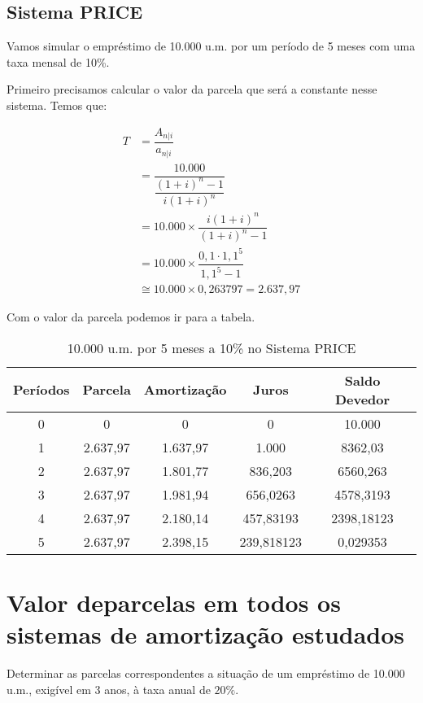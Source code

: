 \subsection{Sistema PRICE}

Vamos simular o empréstimo de 10.000 u.m. por um período de 5 meses com uma taxa mensal de 10\%.

Primeiro precisamos calcular o valor da parcela que será a constante nesse sistema. Temos que:

\begin{align*}
T&=\dfrac{A_{n|i}}{a_{n|i}}\\
&=\dfrac{10.000}{\dfrac{(1+i)^n-1}{i(1+i)^n}}\\
&=10.000\times \dfrac{i(1+i)^n}{(1+i)^n-1}\\
&=10.000 \times \dfrac{0,1\cdot 1,1^5}{1,1^5-1}\\
&\cong 10.000 \times 0,263797= 2.637,97
\end{align*}

Com o valor da parcela podemos ir para a tabela.

\begin{table}[h]
    \centering
    \begin{tabular}{|c|c|c|c|c|}
    \hline
       Períodos  &  Parcela & Amortização & Juros & Saldo Devedor\\
    \hline
       0  & 0 & 0 & 0 & 10.000\\
    \hline
    1     & 2.637,97 & 1.637,97 & 1.000 & 8362,03\\
    \hline
    2     & 2.637,97 & 1.801,77 & 836,203 & 6560,263\\
    \hline
    3     & 2.637,97 & 1.981,94 & 656,0263 & 4578,3193\\
    \hline
    4     & 2.637,97 & 2.180,14 & 457,83193 & 2398,18123\\
    \hline
    5     & 2.637,97 & 2.398,15 & 239,818123 & 0,029353\\
    \hline
    \end{tabular}
    \caption{10.000 u.m. por 5 meses a 10\% no Sistema PRICE}
    \label{tab:my_label}
\end{table}
\section{Valor deparcelas em todos os sistemas de amortização estudados}

Determinar as parcelas correspondentes a situação de um empréstimo de 10.000 u.m., exigível em 3 anos, à taxa anual de $20\%$.

